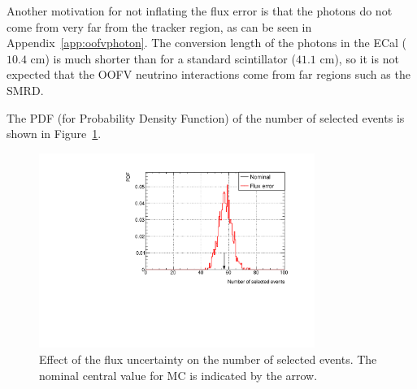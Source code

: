 Another motivation for not inflating the flux error is that the
photons do not come from very far from the tracker region, as can be
seen in Appendix~\ref{app:oofvphoton}. The conversion length of the
photons in the \Gls{ECal} ($10.4\text{~cm}$) is much shorter than for
a standard scintillator ($41.1\text{~cm}$), so it is not expected
that the \Gls{OOFV} neutrino interactions come from far regions such
as the \Gls{SMRD}.

The \Gls{PDF} (for Probability Density Function) of the number of
selected events is shown in Figure~\ref{fig:fluxsystematicspdf}.

\begin{figure}[ht]
  \begin{adjustbox}{center}
    \includegraphics[width=0.8\textwidth]{images/NCg/Flux.pdf} 
  \end{adjustbox}
  \caption[Effect of the flux uncertainty on the number of selected
  events]{Effect of the flux uncertainty on the number of selected
    events. The nominal central value for \Gls{MC} is indicated by the
    arrow.}
  \label{fig:fluxsystematicspdf}
\end{figure}


